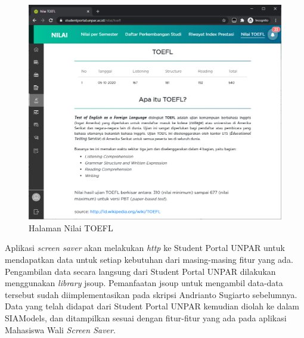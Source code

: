 \begin{enumerate}
\begin{itemize}
       \begin{figure}[H]
        	\centering
        	\includegraphics[scale=0.4]{Gambar/nilai_toefl.png}
        	\caption{Halaman Nilai TOEFL} 
        	\label{fig:3_toefl}
        \end{figure}
    \end{itemize}
\end{enumerate}

Aplikasi \textit{screen saver} akan melakukan \textit{http} ke Student Portal UNPAR untuk mendapatkan data untuk setiap kebutuhan dari masing-masing fitur yang ada. Pengambilan data secara langsung dari Student Portal UNPAR dilakukan menggunakan \textit{library} jsoup. Pemanfaatan jsoup untuk mengambil data-data tersebut sudah diimplementasikan pada skripsi Andrianto Sugiarto \cite{ifstupor} sebelumnya. Data yang telah didapat dari Student Portal UNPAR kemudian diolah ke dalam SIAModels, dan ditampilkan sesuai dengan fitur-fitur yang ada pada aplikasi Mahasiswa Wali \textit{Screen Saver}.

